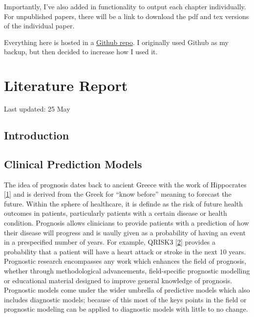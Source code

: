 \documentclass[12pt,PhD,twoside,openright]{muthesis}
\begin{document}
Importantly, I've also added in functionality to output each chapter individually. For unpublished papers, there will be a link to download the pdf and tex versions of the individual paper.

Everything here is hosted in a \href{https://https://github.com/MyKo101/Thesis}{Github repo}. I originally used Github as my backup, but then decided to increase how I used it.

\hypertarget{chap-lit-report}{%
\chapter{Literature Report}\label{chap-lit-report}}


Last updated: 25 May

\hypertarget{introduction-1}{%
\section{Introduction}\label{introduction-1}}

\hypertarget{clinical-prediction-models}{%
\section{Clinical Prediction Models}\label{clinical-prediction-models}}

The idea of prognosis dates back to ancient Greece with the work of Hippocrates {[}\protect\hyperlink{ref-hippocrates_genuine_1886}{1}{]} and is derived from the Greek for ``know before'' meaning to forecast the future. Within the sphere of healthcare, it is definde as the risk of future health outcomes in patients, particularly patients with a certain disease or health condition. Prognosis allows clinicians to provide patients with a prediction of how their disease will progress and is uaully given as a probability of having an event in a prespecified number of years. For example, QRISK3 {[}\protect\hyperlink{ref-hippisley-cox_development_2017}{2}{]} provides a probability that a patient will have a heart attack or stroke in the next 10 years. Prognostic research encompasses any work which enhances the field of prognosis, whether through methodological advancements, field-specific prognostic modelling or educational material designed to improve general knowledge of prognosis. Prognostic models come under the wider umbrella of predictive models which also includes diagnostic models; because of this most of the keys points in the field or prognostic modeling can be applied to diagnostic models with little to no change.
\end{document}
